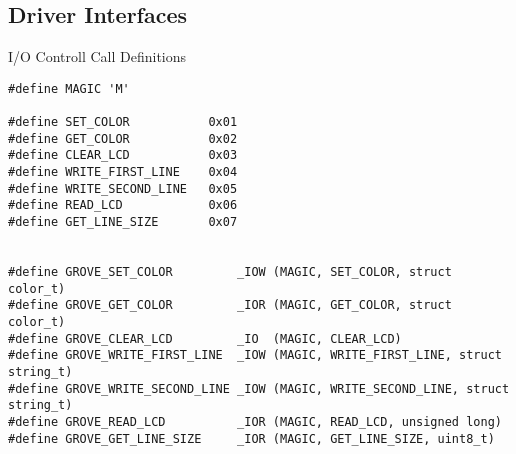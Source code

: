 \subsection{Driver Interfaces}

\begin{listing} [H]
    \caption{I/O Controll Call Definitions}
    \label{lst:ioctldefs}
    \begin{verbatim}
#define MAGIC 'M'

#define SET_COLOR           0x01
#define GET_COLOR           0x02
#define CLEAR_LCD           0x03
#define WRITE_FIRST_LINE    0x04
#define WRITE_SECOND_LINE   0x05
#define READ_LCD            0x06
#define GET_LINE_SIZE       0x07


#define GROVE_SET_COLOR         _IOW (MAGIC, SET_COLOR, struct color_t) 
#define GROVE_GET_COLOR         _IOR (MAGIC, GET_COLOR, struct color_t)
#define GROVE_CLEAR_LCD         _IO  (MAGIC, CLEAR_LCD)
#define GROVE_WRITE_FIRST_LINE  _IOW (MAGIC, WRITE_FIRST_LINE, struct string_t)
#define GROVE_WRITE_SECOND_LINE _IOW (MAGIC, WRITE_SECOND_LINE, struct string_t)
#define GROVE_READ_LCD          _IOR (MAGIC, READ_LCD, unsigned long)
#define GROVE_GET_LINE_SIZE     _IOR (MAGIC, GET_LINE_SIZE, uint8_t)
    \end{verbatim}
\end{listing}


